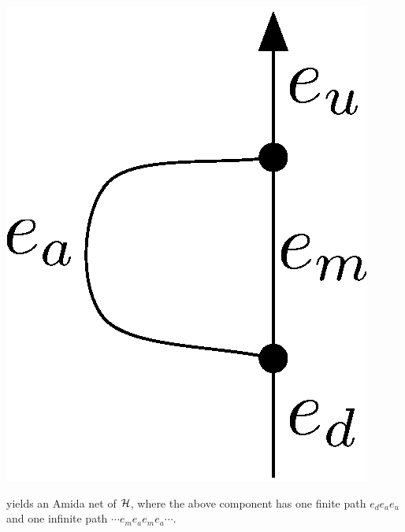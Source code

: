\begin{definition}
\begin{itemize}
\begin{center}
	 \includegraphics[scale=0.4]{oneedge_amida.eps}
	\end{center}
       yields an Amida net of $\mathcal{H}$,
       where the above component has
       one finite path $e_de_ae_u$
       and one infinite path $\cdots e_m e_a e_m e_a \cdots$.
\end{itemize}
 \end{definition}

  \begin{definition}
  \end{definition}

